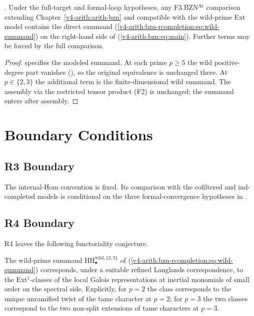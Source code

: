 \begin{proposition}
\label{v4-arith:bzn-rcompletion:prop:minimal-amendment}
\ClaimStatusConjectured. Under the full-target and formal-loop
hypotheses, any F3.BZN\({}^{\mathrm{Ar}}\) comparison extending
Chapter~\ref{v4-arith:arith-bzn} and compatible with the wild-prime Ext
model contains the direct summand
(\ref{v4-arith:bzn-rcompletion:eq:wild-summand}) on the right-hand
side of (\ref{v4-arith:bzn:eq:main}). Further terms may be forced by
the full comparison.
\end{proposition}

\begin{proof}
 specifies
the modeled summand. At each prime \(p\geq 5\) the wild positive-degree
part vanishes
(),
so the original equivalence is unchanged there. At \(p\in\{2,3\}\)
the additional term is the finite-dimensional wild summand. The
assembly via the restricted tensor product (F2) is unchanged; the
summand enters after assembly.
\end{proof}

\section{Boundary Conditions}
\label{v4-arith:bzn-rcompletion:residuals}

\subsection{R3 Boundary}

The internal-Hom convention is fixed.  Its comparison with the
cofiltered and ind-completed models is conditional on the three
formal-convergence hypotheses in
.

\subsection{R4 Boundary}

R4 leaves the following functoriality conjecture.

\begin{conjecture}
\label{v4-arith:bzn-rcompletion:conj:wild-langlands-functorial}
The wild-prime summand
\(\mathrm{HH}_{\bullet}^{\mathrm{wild},\{2,3\}}\) of
(\ref{v4-arith:bzn-rcompletion:eq:wild-summand}) corresponds,
under a suitable refined Langlands correspondence, to the
Ext\({}^{1}\)-classes of the local Galois representations at
inertial monomials of small order on the spectral side. Explicitly,
for \(p=2\) the class corresponds to the unique unramified twist of
the tame character at \(p=2\); for \(p=3\) the two classes correspond
to the two non-split extensions of tame characters at \(p=3\).
\end{conjecture}

